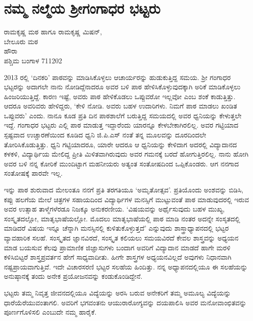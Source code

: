 {\fontsize{14}{16}\selectfont
\chapter{ನಮ್ಮ ನಲ್ಮೆಯ ಶ್ರೀಗಂಗಾಧರ ಭಟ್ಟರು}

\begin{center}
\smallskip

ರಾಮಕೃಷ್ಣ ಮಠ ಹಾಗೂ ರಾಮಕೃಷ್ಣ ಮಿಷನ್,\\
ಬೇಲೂರು ಮಠ \\
ಹೌರಾ \\ 
ಪಶ್ಚಿಮ ಬಂಗಾಳ  \enginline{-}  711202
\addrule
\end{center}

2013 ರಲ್ಲಿ `ದಿನಕರಿ' ಪಾಠವನ್ನು ಮಾಡಿಸಿಕೊಳ್ಳಲು ಆಚಾರ್ಯರನ್ನು ಹುಡುಕುತ್ತಿದ್ದ ಸಮಯ. ಶ್ರೀ ಗಂಗಾಧರ ಭಟ್ಟರನ್ನು ಅದಾಗಲೇ ನಾನು ನೋಡಿದ್ದೆನಾದರೂ ಅವರ ಬಳಿ ಪಾಠ ಹೇಳಿಸಿಕೊಳ್ಳುವುದಕ್ಕಾಗಿ ಅರಿಕೆ ಮಾಡಿಕೊಳ್ಳಲು ಹಿಂಜರಿಯುತ್ತಿದ್ದೆ. ಕಾರಣ ಇಷ್ಟೆ, ಅವರು ಪಾಠ ಹೇಳಿಕೊಡಲು ಒಪ್ಪುವರೋ ಇಲ್ಲವೋ ಎಂಬ ಶಂಕೆ ಕಾಡುತ್ತಿತ್ತು. ಆದರೂ ಅವರಿವರು ಹೇಳಿದ್ದರು, `ಕೇಳಿ ನೋಡಿ. ಅವರು ಬಹಳ ಉದಾರಿಗಳು. ನಿಮಗೆ ಪಾಠ ಮಾಡಲು ಖಂಡಿತ ಒಪ್ಪುವರು' ಎಂದು. ನಾನೂ ಕೂಡ ಪ್ರತಿ ದಿನ ಪಾಠಶಾಲೆಗೆ ಬರುತ್ತಿದ್ದ ಸಮಯದಲ್ಲಿ ಅವರ ಧ್ವನಿಯನ್ನು ಕೇಳುತ್ತಲೇ ಇದ್ದೆ. ಗಂಗಾಧರ ಭಟ್ಟರು ಎಲ್ಲಿ ಪಾಠ ಮಾಡುತ್ತ ಇದ್ದಾರೆಂದು ಯಾರನ್ನೂ ಕೇಳಬೇಕಾಗಿರಲಿಲ್ಲ. ಅವರ ಗಟ್ಟಿಯಾದ ಸ್ಪಷ್ಟವಾದ ಉಚ್ಚಾರಣೆಯಿಂದ ಕೂಡಿದ ಧ್ವನಿ ಜಿ.ಪಿ.ಎಸ್ ನಂತೆ ತನ್ನ ಮೂಲವನ್ನು ದೂರದಿಂದಲೇ ತೋರಿಸಿಕೊಡುತ್ತಿತ್ತು. ಧ್ವನಿ ಗಟ್ಟಿಯಾದರೂ, ಯಾರೇ ಆದರೂ ಆ ಧ್ವನಿಯನ್ನು ಕೇಳಿದಾಗ ಅದರಲ್ಲಿ ವಿದ್ಯಾದಾನದ ಕಳಕಳಿ, ವಿದ್ಯಾರ್ಥಿಯ ಮೇಲಿದ್ದ ಪ್ರೀತಿ ಮಿಳಿತವಾಗಿರುವುದು ಅವರ  ಗಮನಕ್ಕೆ ಬರದೆ ಹೋಗುತ್ತಿರಲಿಲ್ಲ. ನಾನು ಹೋಗಿ ಅವರ ಬಳಿ ನನ್ನ ಕೋರಿಕೆ ಮುಂದಿಟ್ಟಾಗ ಮಹನೀಯರು ಅತ್ಯಂತ ಸಂತೋಷದಿಂದ ಒಪ್ಪಿಕೊಂಡರು. ಆಗ ನನಗಾದ ಸಂತೋಷಕ್ಕೆ ಪಾರವೇ ಇಲ್ಲ. 

ಇನ್ನು ಪಾಠ ಶುರುವಾದ ಮೇಲಂತೂ ನನಗೆ ಪ್ರತಿ ತರಗತಿಯೂ `ಅಮೃತೋತ್ಸವ'. ಪ್ರತಿಯೊಂದು ಅಂಶವನ್ನು ಬಿಡಿಸಿ, ಕಪ್ಪು ಹಲಗೆಯ ಮೇಲೆ ಚಿತ್ರಗಳ ಸಹಾಯದಿಂದ ವಿದ್ಯಾರ್ಥಿಗಳ ಮನಸ್ಸಿಗೆ ಮುಟ್ಟುವಂತೆ ಪಾಠ ಮಾಡುವುದರಲ್ಲಿ ಇರುವ ಅವರ ಉತ್ಸಾಹ ತಾಳ್ಮೆಗಳೆರಡೂ ನಿಜಕ್ಕೂ ಅನುಕರಣೀಯ.  `ವಿಷಯವನ್ನು ಅರ್ಥೈಸುವುದು ಬಹಳ ಮುಖ್ಯ, ಸಂಸ್ಕೃತದಲ್ಲೋ, ಮಾತೃಭಾಷೆಯಲ್ಲೋ. ಮೊದಲು ಮಾತೃಭಾಷೆಯಲ್ಲಿ ಪಾಠ ಮಾಡಿ ನಂತರ ಅದನ್ನೇ ಸಂಸೃತದಲ್ಲಿ ಮಾಡಿದರೆ ವಿಷಯ ಇನ್ನೂ ಚೆನ್ನಾಗಿ ಮನಸ್ಸಿನಲ್ಲಿ ಕುಳಿತುಕೊಳ್ಳುತ್ತದೆ' ಎನ್ನುವುದು ಶಾಸ್ತ್ರಾಧ್ಯಾಪನದಲ್ಲಿ ಭಟ್ಟರ ವ್ಯಾವಹಾರಿಕ ಸಲಹೆ. ಸಂಸ್ಕೃತದ ಜ್ಞಾನವಿರದೆ, ಸಂಸ್ಕೃತ ಕಲಿಯಲು ಸಮಯವಿರದೆ  ಕೇವಲ ಶಾಸ್ತ್ರವನ್ನು ಅಧ್ಯಯನ ಮಾಡ ಬಯಸುವ ಕೆಲವು ಪ್ರಾಮಾಣಿಕ ಜಿಜ್ಞಾಸುಗಳು ಬಂದಾಗ ಅವರಿಗೆ ವಿದ್ಯಾದಾನ ಮಾಡದೆ ಹಾಗೇ ಮರಳಿ ಕಳಿಸಿಬಿಟ್ಟರೆ ಶಾಸ್ತ್ರಪ್ರವರ್ತನ ಹೇಗೆ ಸಾಧ್ಯವಾದೀತು. ಹೀಗೇ ಶಾಸ್ತ್ರಗಳ ಅಧ್ಯಯನವಿಲ್ಲದೆ ಅವುಗಳು ನಿಧಾನವಾಗಿ ನಷ್ಟಪ್ರಾಯವಾಗುತ್ತಿವೆ. ಇದೇ ವಿಚಾರಸರಣಿ ಭಟ್ಟರ ಸಲಹೆಯ ಹಿಂದಿತ್ತು. ನನ್ನ ಅಧ್ಯಾಪನದಲ್ಲಿಯೂ ಈ ಸಲಹೆಯನ್ನು ಅನುಷ್ಠಾನಕ್ಕೆ ತಂದು ಅನೇಕ ಪ್ರಯೋಜನವನ್ನು ಕಂಡುಕೊಂಡಿದ್ದೇನೆ. 

ಭಟ್ಟರು ತಮ್ಮ ನಿವೃತ್ತ ಜೀವನದಲ್ಲಿಯೂ ವಿದ್ಯೆಯನ್ನು ಅರಸಿ ಬರುವ ಅನೇಕರಿಗೆ ತಮ್ಮ ಅಮೂಲ್ಯ ವಿದ್ಯೆಯನ್ನು ಧಾರೆಯೆರೆಯುವಂತಾಗಲಿ. ಅವರಿಗೆ ಭಗವಂತನು ಆಯುರಾರೋಗ್ಯವನ್ನು ದಯಪಾಲಿಸಿ ಅವರ ಮನೋವಾಂಛಿತವನ್ನು ಪೂರ್ಣಗೊಳಿಸಲಿ ಎಂಬುದೇ ನಮ್ಮ ಹಾರೈಕೆ.

\articleend
}
